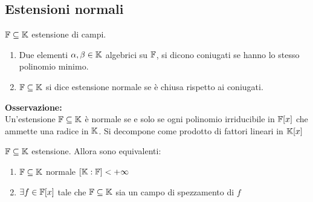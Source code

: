 \documentclass[12px]{article}
\begin{document}
	\subsection{Estensioni normali}
	\begin{defi}
		$\mathbb{F}\subseteq\mathbb{K}$ estensione di campi.
		 \begin{enumerate}
			 \item Due elementi $\alpha, \beta\in\mathbb{K}$ algebrici su  $\mathbb{F}$, si dicono coniugati se hanno lo stesso polinomio minimo.
			 \item $\mathbb{F}\subseteq \mathbb{K}$ si dice estensione normale se è chiusa rispetto ai coniugati.
		\end{enumerate}
	\end{defi}
	\textbf{Osservazione:}\\
	Un'estensione $\mathbb{F}\subseteq\mathbb{K}$  è normale se e solo se ogni polinomio irriducibile in  $\mathbb{F}[x]$ che ammette una radice in  $\mathbb{K}$. Si decompone come prodotto di fattori lineari in  $\mathbb{K}[x]$\\
 \begin{teo}
	$\mathbb{F}\subseteq\mathbb{K}$ estensione. Allora sono equivalenti:
	 \begin{enumerate}
		 \item $\mathbb{F}\subseteq\mathbb{K}$ normale  $[\mathbb{K}:\mathbb{F}]< +\infty$
		 \item  $\exists f\in \mathbb{F}[x]$ tale che  $\mathbb{F}\subseteq\mathbb{K}$ sia un campo di spezzamento di  $f$
	\end{enumerate}
\end{teo}
\end{document}
